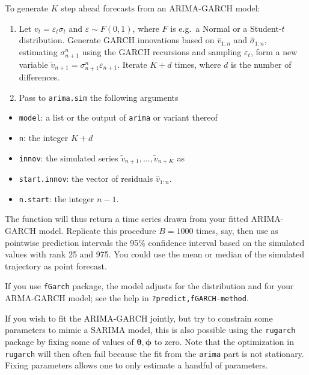 \documentclass[]{book}
\providecommand{\tightlist}{%
  \setlength{\itemsep}{0pt}\setlength{\parskip}{0pt}}
\begin{document}
To generate \(K\) step ahead forecasts from an ARIMA-GARCH model:

\begin{enumerate}
\def\labelenumi{\arabic{enumi}.}
\tightlist
\item
  Let \(v_t=\varepsilon_t\sigma_t\) and \(\varepsilon \sim F(0, 1)\),
  where \(F\) is e.g.~a Normal or a Student-\(t\) distribution. Generate
  GARCH innovations based on \(\widehat{v}_{1:n}\) and
  \(\widehat{\sigma}_{1:n}\), estimating \({\sigma}_{n+1}^{n}\) using
  the GARCH recursions and sampling \(\varepsilon_t\), form a new
  variable
  \(\widetilde{v}_{n+1} = {\sigma}_{n+1}^{n}\varepsilon_{n+1}\). Iterate
  \(K+d\) times, where \(d\) is the number of differences.
\item
  Pass to \texttt{arima.sim} the following arguments
\end{enumerate}

\begin{itemize}
\tightlist
\item
  \texttt{model}: a list or the output of \texttt{arima} or variant
  thereof
\item
  \texttt{n}: the integer \(K+d\)
\item
  \texttt{innov}: the simulated series
  \(\widetilde{v}_{n+1}, \ldots, \widetilde{v}_{n+K}\) as
\item
  \texttt{start.innov}: the vector of residuals \(\widehat{v}_{1:n}\).
\item
  \texttt{n.start}: the integer \(n-1\).
\end{itemize}

The function will thus return a time series drawn from your fitted
ARIMA-GARCH model. Replicate this procedure \(B=1000\) times, say, then
use as pointwise prediction intervals the 95\% confidence interval based
on the simulated values with rank 25 and 975. You could use the mean or
median of the simulated trajectory as point forecast.

If you use \texttt{fGarch} package, the model adjusts for the
distribution and for your ARMA-GARCH model; see the help in
\texttt{?\textquotesingle{}predict,fGARCH-method\textquotesingle{}}.

If you wish to fit the ARIMA-GARCH jointly, but try to constrain some
parameters to mimic a SARIMA model, this is also possible using the
\texttt{rugarch} package by fixing some of values of
\(\boldsymbol{\theta}, \boldsymbol{\phi}\) to zero. Note that the
optimization in \texttt{rugarch} will then often fail because the fit
from the \texttt{arima} part is not stationary. Fixing parameters allows
one to only estimate a handful of parameters.
\end{document}
